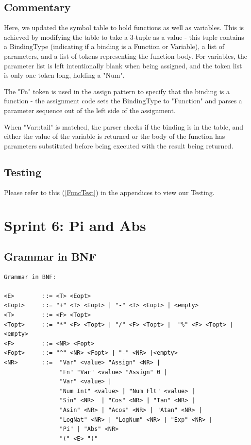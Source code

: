 \documentclass[a4paper, oneside, 11pt]{report}
\begin{document}
\subsection{Commentary}
Here, we updated the symbol table to hold functions as well as variables. This is achieved by modifying the table to take a 3-tuple as a value - this tuple contains a BindingType (indicating if a binding is a Function or Variable), a list of parameters, and a list of tokens representing the function body. For variables, the parameter list is left intentionally blank when being assigned, and the token list is only one token long, holding a "Num".

The "Fn" token is used in the assign pattern to specify that the binding is a function - the assignment code sets the BindingType to "Function" and parses a parameter sequence out of the left side of the assignment.

When "Var::tail" is matched, the parser checks if the binding is in the table, and either the value of the variable is returned or the body of the function has parameters substituted before being executed with the result being returned.  

\subsection{Testing}
Please refer to this (\ref{FuncTest}) in the appendices to view our Testing. \\


\clearpage
\section{Sprint 6: Pi and Abs}
\subsection{Grammar in BNF}
\begin{verbatim}
Grammar in BNF:

<E>        ::= <T> <Eopt>
<Eopt>     ::= "+" <T> <Eopt> | "-" <T> <Eopt> | <empty>
<T>        ::= <F> <Topt>
<Topt>     ::= "*" <F> <Topt> | "/" <F> <Topt> |  "%" <F> <Topt> |<empty>
<F>        ::= <NR> <Fopt>
<Fopt>     ::= "^" <NR> <Fopt> | "-" <NR> |<empty> 
<NR>       ::=  "Var" <value> "Assign" <NR> |
                "Fn" "Var" <value> "Assign" 0 |
                "Var" <value> |
                "Num Int" <value> | "Num Flt" <value> | 
                "Sin" <NR>  | "Cos" <NR> | "Tan" <NR> |
                "Asin" <NR> | "Acos" <NR> | "Atan" <NR> |
                "LogNat" <NR> | "LogNum" <NR> | "Exp" <NR> |
                "Pi" | "Abs" <NR>
                "(" <E> ")"
\end{verbatim}
\end{document}
